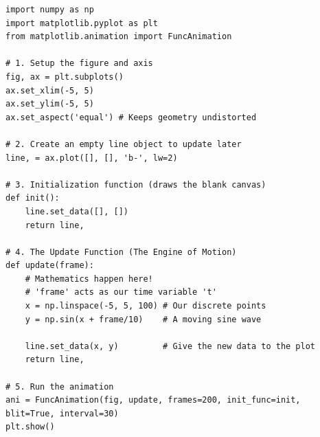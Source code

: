 \documentclass[12pt, a4paper]{report}
\begin{document}
\begin{lstlisting}[caption={The General Matplotlib Animation Pipeline \cite{matplotlib_docs}}]
import numpy as np
import matplotlib.pyplot as plt
from matplotlib.animation import FuncAnimation

# 1. Setup the figure and axis
fig, ax = plt.subplots()
ax.set_xlim(-5, 5)
ax.set_ylim(-5, 5)
ax.set_aspect('equal') # Keeps geometry undistorted

# 2. Create an empty line object to update later
line, = ax.plot([], [], 'b-', lw=2)

# 3. Initialization function (draws the blank canvas)
def init():
    line.set_data([], [])
    return line,

# 4. The Update Function (The Engine of Motion)
def update(frame):
    # Mathematics happen here!
    # 'frame' acts as our time variable 't'
    x = np.linspace(-5, 5, 100) # Our discrete points
    y = np.sin(x + frame/10)    # A moving sine wave
    
    line.set_data(x, y)         # Give the new data to the plot
    return line,

# 5. Run the animation
ani = FuncAnimation(fig, update, frames=200, init_func=init, blit=True, interval=30)
plt.show()
\end{lstlisting}
\end{document}
